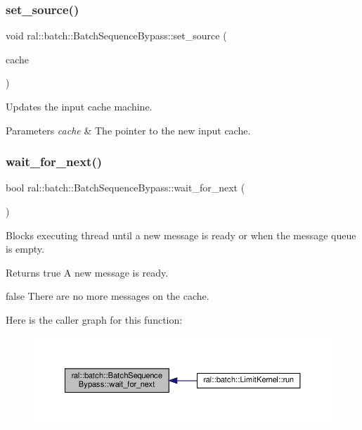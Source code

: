 \subsubsection{\texorpdfstring{set\+\_\+source()}{set\_source()}}
{\footnotesize\ttfamily void ral\+::batch\+::\+Batch\+Sequence\+Bypass\+::set\+\_\+source (\begin{DoxyParamCaption}\item[{std\+::shared\+\_\+ptr$<$ \hyperlink{classral_1_1cache_1_1CacheMachine}{ral\+::cache\+::\+Cache\+Machine} $>$}]{cache }\end{DoxyParamCaption})}

Updates the input cache machine. 
\begin{DoxyParams}{Parameters}
{\em cache} & The pointer to the new input cache. \\
\hline
\end{DoxyParams}
\mbox{\label{classral_1_1batch_1_1BatchSequenceBypass_a623422aa9164a34bce024e92f4f26679}} 
\subsubsection{\texorpdfstring{wait\+\_\+for\+\_\+next()}{wait\_for\_next()}}
{\footnotesize\ttfamily bool ral\+::batch\+::\+Batch\+Sequence\+Bypass\+::wait\+\_\+for\+\_\+next (\begin{DoxyParamCaption}{ }\end{DoxyParamCaption})}

Blocks executing thread until a new message is ready or when the message queue is empty. \begin{DoxyReturn}{Returns}
true A new message is ready. 

false There are no more messages on the cache. 
\end{DoxyReturn}
Here is the caller graph for this function\+:\nopagebreak
\begin{figure}[H]
\begin{center}
\leavevmode
\includegraphics[width=350pt]{classral_1_1batch_1_1BatchSequenceBypass_a623422aa9164a34bce024e92f4f26679_icgraph}
\end{center}
\end{figure}


